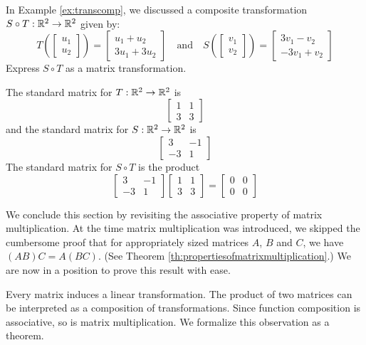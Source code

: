 \documentclass{ximera}
\begin{document}
\begin{example}\label{ex:standardmatofcomp}
In Example \ref{ex:transcomp}, we discussed a composite transformation $S\circ T:\mathbb{R}^2\rightarrow \mathbb{R}^2$
given by:
$$T\left(\begin{bmatrix}u_1\\u_2\end{bmatrix}\right)=\begin{bmatrix}u_1+u_2\\3u_1+3u_2\end{bmatrix}\quad \text{and} \quad
S\left(\begin{bmatrix}v_1\\v_2\end{bmatrix}\right)=\begin{bmatrix}3v_1-v_2\\-3v_1+v_2\end{bmatrix}$$
Express $S\circ T$ as a matrix transformation.
\begin{explanation}
The standard matrix for $T:\mathbb{R}^2\rightarrow \mathbb{R}^2$ is $$\begin{bmatrix}1&1\\3&3\end{bmatrix}$$ and the standard matrix for $S:\mathbb{R}^2\rightarrow \mathbb{R}^2$ is $$\begin{bmatrix}3&-1\\-3&1\end{bmatrix}$$
The standard matrix for $S\circ T$ is the product
$$\begin{bmatrix}3&-1\\-3&1\end{bmatrix}\begin{bmatrix}1&1\\3&3\end{bmatrix}=\begin{bmatrix}0&0\\0&0\end{bmatrix}$$
\end{explanation}
\end{example}

We conclude this section by revisiting the associative property of matrix multiplication.  At the time matrix multiplication was introduced, we skipped the cumbersome proof that for appropriately sized matrices $A$, $B$ and $C$, we have $(AB)C=A(BC)$. (See Theorem \ref{th:propertiesofmatrixmultiplication}.)  We are now in a position to prove this result with ease.  

Every matrix induces a linear transformation.  The product of two matrices can be interpreted as a composition of transformations.  Since function composition is associative, so is matrix multiplication. We formalize this observation as a theorem.
\end{document}
